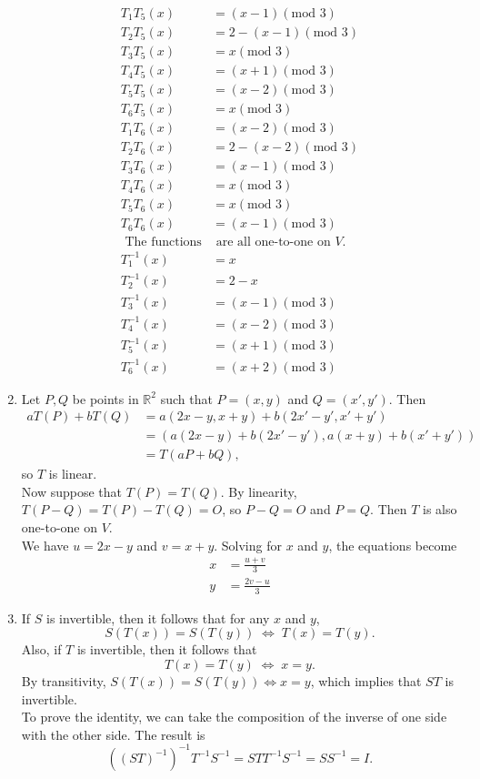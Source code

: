 \documentclass[a4paper,12pt]{article}
\begin{document}
\begin{enumerate}
\begin{align*}
		T_1T_5(x) &= (x - 1)(\mbox{mod }3) \\
		T_2T_5(x) &= 2 - (x - 1)(\mbox{mod }3) \\
		T_3T_5(x) &= x(\mbox{mod }3) \\
		T_4T_5(x) &= (x + 1)(\mbox{mod }3) \\
		T_5T_5(x) &= (x - 2)(\mbox{mod }3) \\
		T_6T_5(x) &= x(\mbox{mod }3) \\
		T_1T_6(x) &= (x - 2)(\mbox{mod }3) \\
		T_2T_6(x) &= 2 - (x - 2)(\mbox{mod }3) \\
		T_3T_6(x) &= (x - 1)(\mbox{mod }3) \\
		T_4T_6(x) &= x(\mbox{mod }3) \\
		T_5T_6(x) &= x(\mbox{mod }3) \\
		T_6T_6(x) &= (x - 1)(\mbox{mod }3) \\
		\mbox{ The functions}&\mbox{ are all one-to-one on }V. \\
		T_1^{-1}(x) &= x \\
		T_2^{-1}(x) &= 2 - x \\
		T_3^{-1}(x) &= (x - 1)(\mbox{mod }3) \\
		T_4^{-1}(x) &= (x - 2)(\mbox{mod }3) \\
		T_5^{-1}(x) &= (x + 1)(\mbox{mod }3) \\
		T_6^{-1}(x) &= (x + 2)(\mbox{mod }3)
		\end{align*}
		
		\setcounter{enumi}{11}
		\item Let $P, Q$ be points in $\mathbb{R}^2$ such that $P = (x, y)$ and $Q = (x', y')$. Then
		\begin{align*}
		aT(P) + bT(Q) &= a(2x - y, x + y) + b(2x' - y', x' + y') \\
		&= \left(a(2x - y) + b(2x' - y'), a(x + y) + b(x' + y')\right) \\
		&= T(aP + bQ),
		\end{align*}
		so $T$ is linear. \\
		Now suppose that $T(P) = T(Q)$. By linearity, $T(P - Q) = T(P) - T(Q) = O$, so $P - Q = O$ and $P = Q$. Then $T$ is also one-to-one on $V$. \\
		We have $u = 2x - y$ and $v = x + y$. Solving for $x$ and $y$, the equations become
		\begin{align*}
		x &= \frac{u + v}{3} \\
		y &= \frac{2v - u}{3}
		\end{align*}
		
		\setcounter{enumi}{22}
		\item If $S$ is invertible, then it follows that for any $x$ and $y$,
		\[ S(T(x)) = S(T(y)) \; \Leftrightarrow \; T(x) = T(y). \]
		Also, if $T$ is invertible, then it follows that
		\[ T(x) = T(y) \; \Leftrightarrow \; x = y. \]
		By transitivity, $S(T(x)) = S(T(y)) \Leftrightarrow x = y$, which implies that $ST$ is invertible. \\
		To prove the identity, we can take the composition of the inverse of one side with the other side. The result is
		\[ \left((ST)^{-1}\right)^{-1}T^{-1}S^{-1} = STT^{-1}S^{-1} = SS^{-1} = I. \]
	\end{enumerate}
\end{document}
